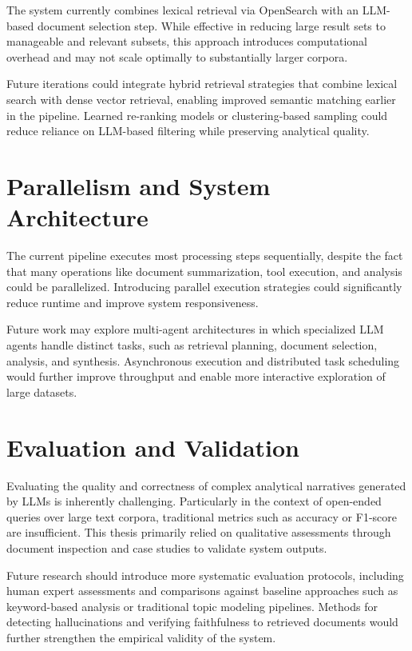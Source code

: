 The system currently combines lexical retrieval via OpenSearch with an LLM-based document selection step. While effective in reducing large result sets to manageable and relevant subsets, this approach introduces computational overhead and may not scale optimally to substantially larger corpora.

Future iterations could integrate hybrid retrieval strategies that combine lexical search with dense vector retrieval, enabling improved semantic matching earlier in the pipeline. Learned re-ranking models or clustering-based sampling could reduce reliance on LLM-based filtering while preserving analytical quality.

\section{Parallelism and System Architecture}

The current pipeline executes most processing steps sequentially, despite the fact that many operations like document summarization, tool execution, and analysis could be parallelized. Introducing parallel execution strategies could significantly reduce runtime and improve system responsiveness.

Future work may explore multi-agent architectures in which specialized LLM agents handle distinct tasks, such as retrieval planning, document selection, analysis, and synthesis. Asynchronous execution and distributed task scheduling would further improve throughput and enable more interactive exploration of large datasets.

\section{Evaluation and Validation}

Evaluating the quality and correctness of complex analytical narratives generated by LLMs is inherently challenging. Particularly in the context of open-ended queries over large text corpora, traditional metrics such as accuracy or F1-score are insufficient. This thesis primarily relied on qualitative assessments through document inspection and case studies to validate system outputs.

Future research should introduce more systematic evaluation protocols, including human expert assessments and comparisons against baseline approaches such as keyword-based analysis or traditional topic modeling pipelines. Methods for detecting hallucinations and verifying faithfulness to retrieved documents would further strengthen the empirical validity of the system.

